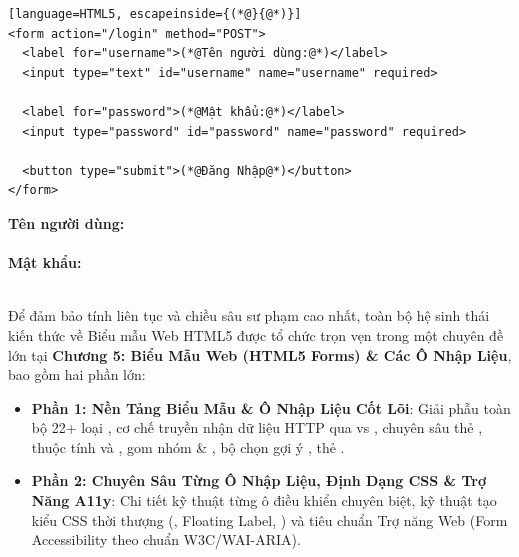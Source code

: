 \begin{codeWindow}
\begin{lstlisting}[language=HTML5, escapeinside={(*@}{@*)}]
<form action="/login" method="POST">
  <label for="username">(*@Tên người dùng:@*)</label>
  <input type="text" id="username" name="username" required>

  <label for="password">(*@Mật khẩu:@*)</label>
  <input type="password" id="password" name="password" required>

  <button type="submit">(*@Đăng Nhập@*)</button>
</form>
\end{lstlisting}
\end{codeWindow}

\begin{browserWindow}
\sffamily\small
\begin{tcolorbox}[colback=white, colframe=primaryBlue!30, arc=4pt, boxrule=0.8pt, top=8pt, bottom=8pt, left=10pt, right=10pt]
  \textbf{Tên người dùng:} \\[2pt]
  \tcbox[on line, arc=3pt, colback=codeBg, colframe=codeBorder, boxsep=2pt, left=8pt, right=60pt]{\textcolor{gray!80}{nguyenvana}} \\[8pt]
  \textbf{Mật khẩu:} \\[2pt]
  \tcbox[on line, arc=3pt, colback=codeBg, colframe=codeBorder, boxsep=2pt, left=8pt, right=60pt]{\textcolor{gray!80}{$\bullet\bullet\bullet\bullet\bullet\bullet\bullet\bullet$}} \\[10pt]
\end{tcolorbox}
\end{browserWindow}

\begin{noteBox}
Để đảm bảo tính liên tục và chiều sâu sư phạm cao nhất, toàn bộ hệ sinh thái kiến thức về Biểu mẫu Web HTML5 được tổ chức trọn vẹn trong một chuyên đề lớn tại \textbf{Chương 5: Biểu Mẫu Web (HTML5 Forms) \& Các Ô Nhập Liệu}, bao gồm hai phần lớn:
\begin{itemize}[leftmargin=1.5em, itemsep=3pt, parsep=0pt]
    \item \textbf{Phần 1: Nền Tảng Biểu Mẫu \& Ô Nhập Liệu Cốt Lõi}: Giải phẫu toàn bộ 22+ loại , cơ chế truyền nhận dữ liệu HTTP qua  vs , chuyên sâu thẻ , thuộc tính  và , gom nhóm  \& , bộ chọn gợi ý , thẻ .
    \item \textbf{Phần 2: Chuyên Sâu Từng Ô Nhập Liệu, Định Dạng CSS \& Trợ Năng A11y}: Chi tiết kỹ thuật từng ô điều khiển chuyên biệt, kỹ thuật tạo kiểu CSS thời thượng (, Floating Label, ) và tiêu chuẩn Trợ năng Web (Form Accessibility theo chuẩn W3C/WAI-ARIA).
\end{itemize}
\end{noteBox}

